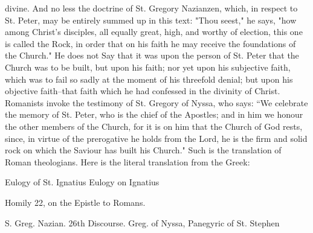 divine. And no less the doctrine of St. Gregory Nazianzen, which, in respect to St. Peter, may be entirely summed up in this text: "Thou seest," he says, "how among Christ's disciples, all equally great, high, and worthy of election, this one is called the Rock, in order that on his faith he may receive the foundations of the Church." He does not Say that it was upon the person of St. Peter that the Church was to be built, but upon his faith; nor yet upon his subjective faith, which was to fail so sadly at the moment of his threefold denial; but upon his objective faith--that faith which he had confessed in the divinity of Christ. Romanists invoke the testimony of St. Gregory of Nyssa, who says: “We celebrate the memory of St. Peter, who is the chief of the Apostles; and in him we honour the other members of the Church, for it is on him that the Church of God rests, since, in virtue of the prerogative he holds from the Lord, he is the firm and solid rock on which the Saviour has built his Church." Such is the translation of Roman theologians. Here is the literal translation from the Greek:

Eulogy of St. Ignatius Eulogy on Ignatius

Homily 22, on the Epistle to Romans.

S. Greg. Nazian. 26th Discourse. Greg. of Nyssa, Panegyric of St. Stephen


